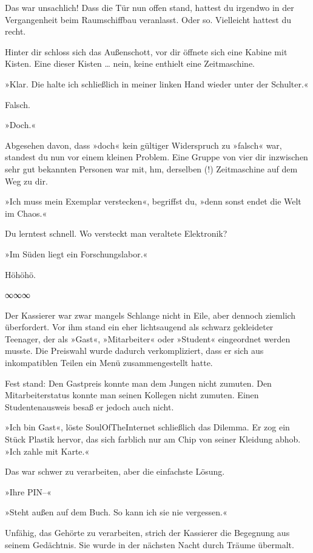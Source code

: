 Das war unsachlich! Dass die Tür nun offen stand, hattest du irgendwo in der Vergangenheit beim Raumschiffbau veranlasst. Oder so. Vielleicht hattest du recht.

Hinter dir schloss sich das Außenschott, vor dir öffnete sich eine Kabine mit Kisten. Eine dieser Kisten … nein, keine enthielt eine Zeitmaschine.

»Klar. Die halte ich schließlich in meiner linken Hand wieder unter der Schulter.«

Falsch.

»Doch.«

Abgesehen davon, dass »doch« kein gültiger Widerspruch zu »falsch« war, standest du nun vor einem kleinen Problem. Eine Gruppe von vier dir inzwischen sehr gut bekannten Personen war mit, hm, derselben (!) Zeitmaschine auf dem Weg zu dir.

»Ich muss mein Exemplar verstecken«, begriffst du, »denn sonst endet die Welt im Chaos.«

Du lerntest schnell. Wo versteckt man veraltete Elektronik?

»Im Süden liegt ein Forschungslabor.«

Höhöhö.

\begin{center}
∞∞∞
\end{center}

Der Kassierer war zwar mangels Schlange nicht in Eile, aber dennoch ziemlich überfordert. Vor ihm stand ein eher lichtsaugend als schwarz gekleideter Teenager, der als »Gast«, »Mitarbeiter« oder »Student« eingeordnet werden musste. Die Preiswahl wurde dadurch verkompliziert, dass er sich aus inkompatiblen Teilen ein Menü zusammengestellt hatte.

Fest stand: Den Gastpreis konnte man dem Jungen nicht zumuten. Den Mitarbeiterstatus konnte man seinen Kollegen nicht zumuten. Einen Studentenausweis besaß er jedoch auch nicht.

»Ich bin Gast«, löste SoulOfTheInternet schließlich das Dilemma. Er zog ein Stück Plastik hervor, das sich farblich nur am Chip von seiner Kleidung abhob. »Ich zahle mit Karte.«

Das war schwer zu verarbeiten, aber die einfachste Lösung.

»Ihre PIN–«

»Steht außen auf dem Buch. So kann ich sie nie vergessen.«

Unfähig, das Gehörte zu verarbeiten, strich der Kassierer die Begegnung aus seinem Gedächtnis. Sie wurde in der nächsten Nacht durch Träume übermalt.

